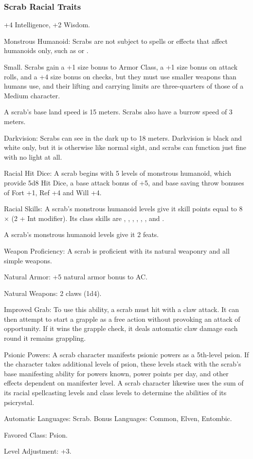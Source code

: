 \subsubsection{Scrab Racial Traits}
\begin{itemize*}
    \item +4 Intelligence, +2 Wisdom.
    \item Monstrous Humanoid: Scrabs are not subject to spells or effects that affect humanoids only, such as  or .
    \item Small. Scrabs gain a +1 size bonus to Armor Class, a +1 size bonus on attack rolls, and a +4 size bonus on  checks, but they must use smaller weapons than humans use, and their lifting and carrying limits are three-quarters of those of a Medium character.
    \item A scrab's base land speed is 15 meters. Scrabs also have a burrow speed of 3 meters.
    \item Darkvision: Scrabs can see in the dark up to 18 meters. Darkvision is black and white only, but it is otherwise like normal sight, and scrabs can function just fine with no light at all.
    \item Racial Hit Dice: A scrab begins with 5 levels of monstrous humanoid, which provide 5d8 Hit Dice, a base attack bonus of +5, and base saving throw bonuses of Fort +1, Ref +4 and Will +4.
    \item Racial Skills: A scrab's monstrous humanoid levels give it skill points equal to 8 $\times$ (2 + Int modifier). Its class skills are , , , , , , and .
    \item A scrab's monstrous humanoid levels give it 2 feats.
    \item Weapon Proficiency: A scrab is proficient with its natural weaponry and all simple weapons.
    \item Natural Armor: +5 natural armor bonus to AC.
    \item Natural Weapons: 2 claws (1d4).
    \item Improved Grab: To use this ability, a scrab must hit with a claw attack. It can then attempt to start a grapple as a free action without provoking an attack of opportunity. If it wins the grapple check, it deals automatic claw damage each round it remains grappling.
	\item Psionic Powers: A scrab character manifests psionic powers as a 5th-level psion. If the character takes additional levels of psion, these levels stack with the scrab's base manifesting ability for powers known, power points per day, and other effects dependent on manifester level. A scrab character likewise uses the sum of its racial spellcasting levels and class levels to determine the abilities of its psicrystal.
    \item Automatic Languages: Scrab. Bonus Languages: Common, Elven, Entombic.
    \item Favored Class: Psion.
    \item Level Adjustment: +3.
\end{itemize*}
